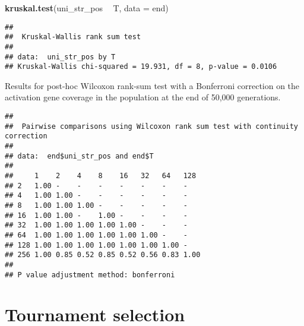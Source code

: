 \documentclass[]{book}
\newenvironment{Shaded}{\begin{snugshade}}{\end{snugshade}}
\newcommand{\DataTypeTok}[1]{\textcolor[rgb]{0.13,0.29,0.53}{#1}}
\newcommand{\KeywordTok}[1]{\textcolor[rgb]{0.13,0.29,0.53}{\textbf{#1}}}
\newcommand{\NormalTok}[1]{#1}
\newcommand{\OperatorTok}[1]{\textcolor[rgb]{0.81,0.36,0.00}{\textbf{#1}}}
\newcommand{\OtherTok}[1]{\textcolor[rgb]{0.56,0.35,0.01}{#1}}
\newcommand{\StringTok}[1]{\textcolor[rgb]{0.31,0.60,0.02}{#1}}
\begin{document}
\begin{Shaded}
\begin{Highlighting}[]
\KeywordTok{kruskal.test}\NormalTok{(uni_str_pos }\OperatorTok{~}\StringTok{ }\NormalTok{T, }\DataTypeTok{data =}\NormalTok{ end)}
\end{Highlighting}
\end{Shaded}

\begin{verbatim}
## 
##  Kruskal-Wallis rank sum test
## 
## data:  uni_str_pos by T
## Kruskal-Wallis chi-squared = 19.931, df = 8, p-value = 0.0106
\end{verbatim}

Results for post-hoc Wilcoxon rank-sum test with a Bonferroni correction on the activation gene coverage in the population at the end of 50,000 generations.

\begin{Shaded}
\end{Shaded}

\begin{verbatim}
## 
##  Pairwise comparisons using Wilcoxon rank sum test with continuity correction 
## 
## data:  end$uni_str_pos and end$T 
## 
##     1    2    4    8    16   32   64   128 
## 2   1.00 -    -    -    -    -    -    -   
## 4   1.00 1.00 -    -    -    -    -    -   
## 8   1.00 1.00 1.00 -    -    -    -    -   
## 16  1.00 1.00 -    1.00 -    -    -    -   
## 32  1.00 1.00 1.00 1.00 1.00 -    -    -   
## 64  1.00 1.00 1.00 1.00 1.00 1.00 -    -   
## 128 1.00 1.00 1.00 1.00 1.00 1.00 1.00 -   
## 256 1.00 0.85 0.52 0.85 0.52 0.56 0.83 1.00
## 
## P value adjustment method: bonferroni
\end{verbatim}

\hypertarget{tournament-selection}{%
\chapter{Tournament selection}\label{tournament-selection}}
\end{document}
